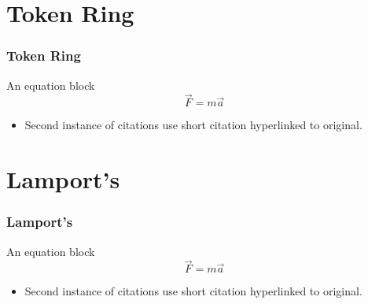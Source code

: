 \documentclass[t, pdftex]{beamer}
\begin{document}
\section{Token Ring}
\begin{frame}[c]
    \frametitle{Token Ring}
    \begin{block}{An equation block}
        \[ \vec{F} = m \vec{a} \]
    \end{block}
    \begin{itemize}
        \item Second instance of citations use short citation hyperlinked to original.
    \end{itemize}
\end{frame}

\section{Lamport's}
\begin{frame}[c]
    \frametitle{Lamport's}
    \begin{block}{An equation block}
        \[ \vec{F} = m \vec{a} \]
    \end{block}
    \begin{itemize}
        \item Second instance of citations use short citation hyperlinked to original.
    \end{itemize}
\end{frame}
\end{document}
